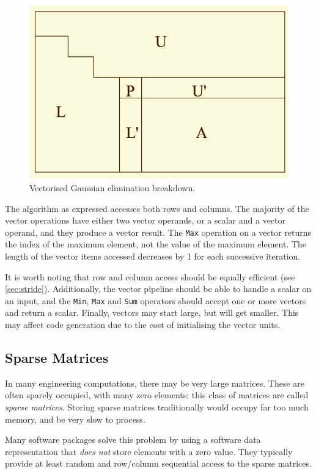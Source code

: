 \begin{figure}
\centering
\includegraphics[width=0.7\linewidth]{figures/screenshot086}
\caption{Vectorised Gaussian elimination \footnotemark breakdown.}
\label{fig:screenshot086}
\end{figure}

The algorithm as expressed accesses both rows and columns. The majority of the vector operations have either two vector operands, or a scalar and a vector operand, and they produce a vector result. The \texttt{Max} operation on a vector returns the index of the maximum element, not the value of the maximum element. The length of the vector items accessed decreases by 1 for each successive iteration. 

It is worth noting that row and column access should be equally efficient (see \autoref{sec:stride}). Additionally, the vector pipeline should be able to handle a scalar on an input, and the \texttt{Min}, \texttt{Max} and \texttt{Sum} operators should accept one or more vectors and return a scalar. Finally, vectors may start large, but will get smaller. This may affect code generation due to the cost of initialising the vector units.

\subsection{Sparse Matrices}
In many engineering computations, there may be very large matrices. These are often sparely occupied, with many zero elements; this class of matrices are called \textit{sparse matrices}. Storing sparse matrices traditionally would occupy far too much memory, and be very slow to process.

Many software packages solve this problem by using a software data representation that \textit{does not} store elements with a zero value. They typically provide at least random and row/column sequential access to the sparse matrices.

